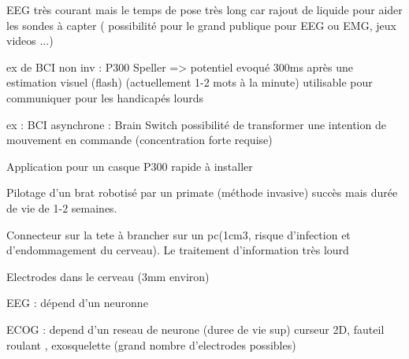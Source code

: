 \documentclass[a4paper,12pt]{article}
\begin{document}
EEG très courant mais le temps de pose très long car rajout de liquide pour aider les sondes à capter ( possibilité pour le grand publique pour EEG ou EMG, jeux videos ...)

ex de BCI non inv : P300 Speller => potentiel evoqué 300ms après une estimation visuel (flash) (actuellement 1-2 mots à la minute)
  utilisable pour communiquer pour les handicapés lourds

ex : BCI asynchrone : Brain Switch
  possibilité de transformer une intention de mouvement en commande (concentration forte requise)

Application pour un casque P300 rapide à installer

Pilotage d'un brat robotisé par un primate (méthode invasive) succès mais durée de vie de 1-2 semaines.

Connecteur sur la tete à brancher sur un pc(1cm3, risque d'infection et d'endommagement du cerveau). Le traitement d'information très lourd 

Electrodes dans le cerveau (3mm environ)

EEG : dépend d'un neuronne

ECOG : depend d'un reseau de neurone (duree de vie sup)
curseur 2D, fauteil roulant , exosquelette (grand nombre d'electrodes possibles)
\end{document}
